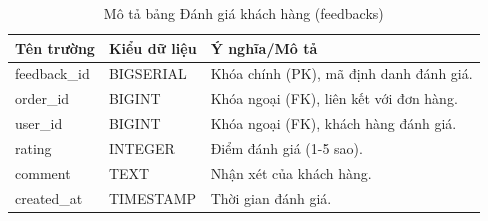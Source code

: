 \documentclass[../20232006p.tex]{subfiles}
\begin{document}
\begin{table}[H]
    \centering
    \caption{Mô tả bảng Đánh giá khách hàng (feedbacks)}
    \label{tab:feedbacks}
    \begin{tabular}{|p{3cm}|p{3cm}|p{8cm}|}
        \hline
        \textbf{Tên trường} & \textbf{Kiểu dữ liệu} & \textbf{Ý nghĩa/Mô tả}                  \\
        \hline
        feedback\_id        & BIGSERIAL             & Khóa chính (PK), mã định danh đánh giá. \\
        \hline
        order\_id           & BIGINT                & Khóa ngoại (FK), liên kết với đơn hàng. \\
        \hline
        user\_id            & BIGINT                & Khóa ngoại (FK), khách hàng đánh giá.   \\
        \hline
        rating              & INTEGER               & Điểm đánh giá (1-5 sao).                \\
        \hline
        comment             & TEXT                  & Nhận xét của khách hàng.                \\
        \hline
        created\_at         & TIMESTAMP             & Thời gian đánh giá.                     \\
        \hline
    \end{tabular}
\end{table}
\end{document}
